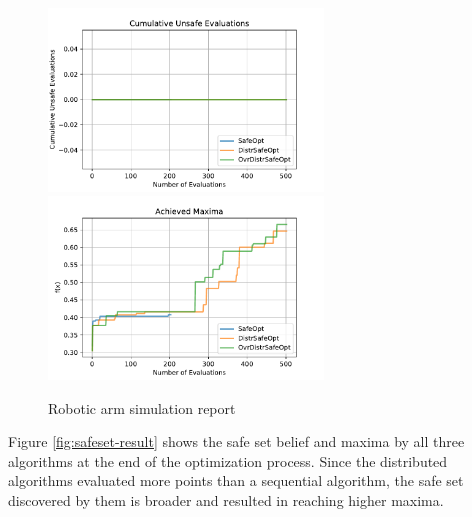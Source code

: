 \begin{figure}[h!]
	\centering
	\includegraphics[width=0.65\textwidth]{figures/results/robot-cum-unsafe.pdf}
	\includegraphics[width=0.65\textwidth]{figures/results/robot-maxima.pdf}
	\caption{Robotic arm simulation report}
	\label{fig:robot-result}
\end{figure}


Figure \ref{fig:safeset-result} shows the safe set belief and maxima by all three algorithms at the end of the optimization process. Since the distributed algorithms evaluated more points than a sequential algorithm, the safe set discovered by them is broader and resulted in reaching higher maxima.


